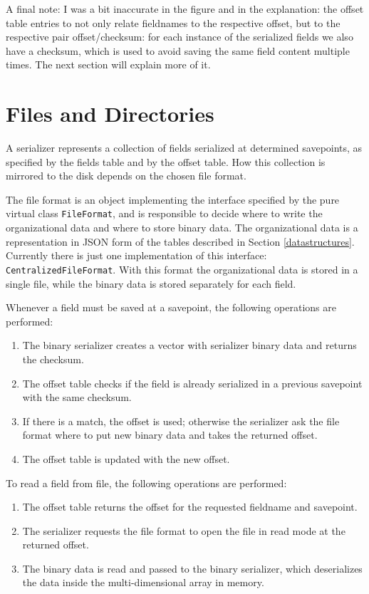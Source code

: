\documentclass[a4paper,10pt]{article}
\begin{document}
A final note: I was a bit inaccurate in the figure and in the explanation: the 
offset table entries to not only relate fieldnames to the respective offset, 
but to the respective pair offset/checksum: for each instance of the serialized 
fields we also have a checksum, which is used to avoid saving the same field 
content multiple times. The next section will explain more of it.

\section{Files and Directories}

A serializer represents a collection of fields serialized at determined
savepoints, as specified by the fields table and by the offset table.
How this collection is mirrored to the disk depends on the chosen file format.

The file format is an object implementing the interface specified by the pure 
virtual class \texttt{FileFormat}, and is responsible to decide where to write 
the organizational data and where to store binary data. The 
organizational data is a representation in JSON form of the tables described in 
Section \ref{datastructures}. Currently there is just one implementation 
of this interface: \texttt{CentralizedFileFormat}. With this format the 
organizational data is stored in a single file, while the binary data is stored 
separately for each field.

Whenever a field must be saved at a savepoint, the following operations are 
performed:

\begin{enumerate}
 \item The binary serializer creates a vector with serializer binary data and 
returns the checksum.
 \item The offset table checks if the field is already serialized in a previous 
savepoint with the same checksum.
 \item If there is a match, the offset is used; otherwise the serializer 
ask the file format where to put new binary data and takes the returned offset.
 \item The offset table is updated with the new offset.
\end{enumerate}

To read a field from file, the following operations are performed:

\begin{enumerate}
 \item The offset table returns the offset for the requested fieldname and 
savepoint.
 \item The serializer requests the file format to open the file in read mode at 
the returned offset.
 \item The binary data is read and passed to the binary serializer, which 
deserializes the data inside the multi-dimensional array in memory.
\end{enumerate}
\end{document}
